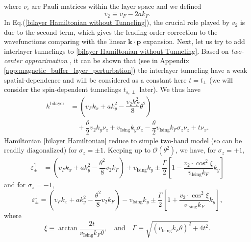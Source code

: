 \begin{subappendices}
	where $\nu_i$ are Pauli matrices within the layer space and we defined
	\begin{equation}
		v_2\equiv v_F-2ak_F.\label{eqn:v2_definition}
	\end{equation}
	In Eq.(\ref{bilayer Hamiltonian without Tunneling}), the crucial role played by $v_2$ is due to the second term, which gives the leading order correction to the wavefunctions comparing with the linear $\bm{k\cdot p}$ expansion.
	\indent Next, let us try to add interlayer tunnelings to \eqref{bilayer Hamiltonian without Tunneling}. Based on \emph{two-center approximation} \cite{bistritzer2011moire}, it can be shown that (see in Appendix \ref{app:magnetic_buffer_layer_perturbation}) the interlayer tunneling have a weak spatial-dependence and will be considered as a constant here $t=t_\perp$ (we will consider the spin-dependent tunnelings $t_{s,\perp}$ later). We thus have
	\begin{align}\label{bilayer Hamiltonian}
		h^{\text{bilayer}} & =\left(v_F k_x+ak_y^2-\dfrac{v_2k_F^2}{8}\theta^2\right)\nonumber                                                           \\
		                   & \quad+\dfrac{\theta}{2}v_2 k_y\nu_z+v_{\text{Ising}} k_y\sigma_z-\dfrac{\theta}{2}v_{\text{Ising}} k_F\sigma_z\nu_z+t\nu_x.
	\end{align}
	Hamiltonian \eqref{bilayer Hamiltonian} reduce to simple two-band model \cite{bernevig2013topological} (so can be readily diagonalized) for $\sigma_z=\pm1$. Keeping up to $\mathcal{O}(\theta^2)$, we have, for $\sigma_z=+1$,
	\begin{align*}
		\varepsilon_\pm^\uparrow & =\left(v_F k_x +a k_y^2-\dfrac{\theta^2}{8}v_2 k_F\right)+v_{\text{Ising}}k_y\pm\dfrac{\Gamma}{2}\left[1-\dfrac{v_2\cdot\cos^2\xi}{v_{\text{Ising}} k_F}k_y\right]
	\end{align*}
	and for $\sigma_z=-1$,
	\begin{equation*}
		\varepsilon^\downarrow_\pm=\left(v_F k_x +a k_y^2-\dfrac{\theta^2}{8}v_2 k_F\right)-v_{\text{Ising}}k_y\pm\dfrac{\Gamma}{2}\left[1+\dfrac{v_2\cdot\cos^2\xi}{v_{\text{Ising}} k_F}k_y\right],
	\end{equation*}
	where
	\begin{equation*}
		\xi\equiv \arctan\dfrac{2t}{v_{\text{Ising}} k_F \theta},\quad\text{and}\quad\Gamma\equiv\sqrt{(v_{\text{Ising}}k_F\theta)^2+4t^2}.
	\end{equation*}


\end{subappendices}
